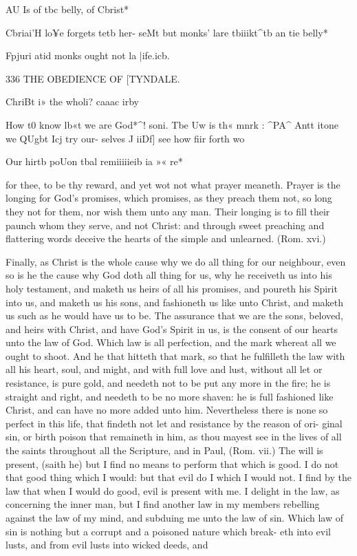 \documentclass{custom}
\begin{document}
{AU Is of 
tbc belly, 
of Cbrist* 

Cbriai'H 
lo¥e forgets 
tetb her- 
seMt but 
monks' lare 
tbiiikt^tb an 
tie belly* 

Fpjuri atid 
monks 
ought not 
la |ife.icb. 


336
THE OBEDIENCE OF
[TYNDALE.

ChriBt i» 
the wholi? 
caaac irby 

How t0 
know lb«t 
we are 
God*^! soni. 
Tbe Uw is 
th« mnrk : 
^PA^ Antt 
itone 
we QUgbt 
Icj try our- 
selves J iiDf] 
see how fiir 
forth wo 

Our hirtb 
poUon tbal 
remiiiiieib 
ia »« re* 

for thee, to be thy reward, and yet wot not what prayer
meaneth. Prayer is the longing for God's promises, 
which promises, as they preach them not, so long they not 
for them, nor wish them unto any man. Their longing is 
to fill their paunch whom they serve, and not Christ: and 
through sweet preaching and flattering words deceive the 
hearts of the simple and unlearned. (Rom. xvi.) 

Finally, as Christ is the whole cause why we do all 
thing for our neighbour, even so is he the cause why God 
doth all thing for us, why he receiveth us into his holy 
testament, and maketh us heirs of all his promises, and 
poureth his Spirit into us, and maketh us his sons, and 
fashioneth us like unto Christ, and maketh us such as he 
would have us to be. The assurance that we are the sons, 
beloved, and heirs with Christ, and have God's Spirit in 
us, is the consent of our hearts unto the law of God. 
Which law is all perfection, and the mark whereat all we 
ought to shoot. And he that hitteth that mark, so that 
he fulfilleth the law with all his heart, soul, and might, and 
with full love and lust, without all let or resistance, is pure 
gold, and needeth not to be put any more in the fire; he is 
straight and right, and needeth to be no more shaven: he 
is full fashioned like Christ, and can have no more added 
unto him. Nevertheless there is none so perfect in this 
life, that findeth not let and resistance by the reason of ori- 
ginal sin, or birth poison that remaineth in him, as thou 
mayest see in the lives of all the saints throughout all the 
Scripture, and in Paul, (Rom. vii.) The will is present, 
(saith he) but I find no means to perform that which is 
good. I do not that good thing which I would: but that 
evil do I which I would not. I find by the law that when 
I would do good, evil is present with me. I delight in the 
law, as concerning the inner man, but I find another law 
in my members rebelling against the law of my mind, and 
subduing me unto the law of sin. Which law of sin is 
nothing but a corrupt and a poisoned nature which break- 
eth into evil lusts, and from evil lusts into wicked deeds, and 


}
\end{document}
